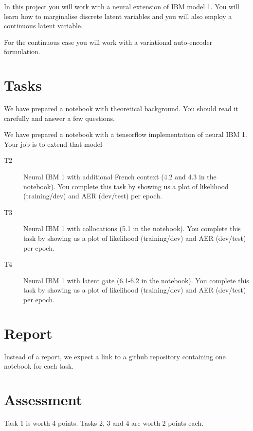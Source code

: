 In this project you will work with a neural extension of IBM model 1. 
You will learn how to marginalise discrete latent variables and you will also employ a continuous latent variable.

For the continuous case you will work with a variational auto-encoder formulation.


\section{Tasks}

\begin{description}
	\item[T1] We have prepared a notebook with theoretical background. You should read it carefully and answer a few questions.
	\item We have prepared a notebook with a tensorflow implementation of neural IBM 1. Your job is to extend that model 
	\begin{description}
		\item[T2] Neural IBM 1 with additional French context (4.2 and 4.3 in the notebook). You complete this task by showing us a plot of likelihood (training/dev) and AER (dev/test) per epoch.
		\item[T3] Neural IBM 1 with collocations (5.1 in the notebook). You complete this task by showing us a plot of likelihood (training/dev) and AER (dev/test) per epoch.
		\item[T4] Neural IBM 1 with latent gate (6.1-6.2 in the notebook). You complete this task by showing us a plot of likelihood (training/dev) and AER (dev/test) per epoch.
	\end{description}
\end{description}

\section{Report}

Instead of a report, we expect a link to a github repository containing one notebook for each task. 

\section{Assessment}

Task 1 is worth 4 points. Tasks 2, 3 and 4 are worth 2 points each. 